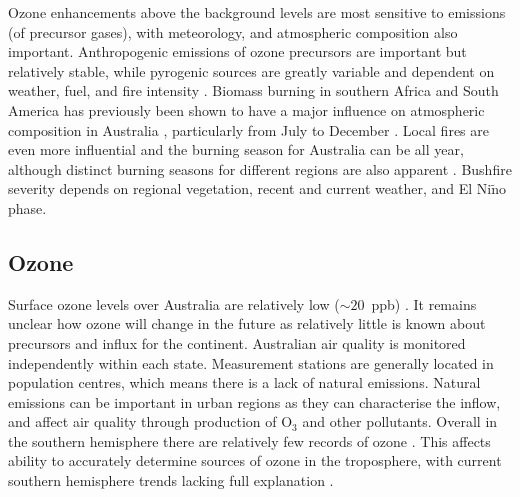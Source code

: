   Ozone enhancements above the background levels are most sensitive to emissions (of precursor gases), with meteorology, and atmospheric composition also important.
  Anthropogenic emissions of ozone precursors are important but relatively stable, while pyrogenic sources are greatly variable and dependent on weather, fuel, and fire intensity \parencite[e.g.,][]{Lawson2017}. 
  Biomass burning in southern Africa and South America has previously been shown to have a major influence on atmospheric composition in Australia \parencite{Oltmans2001, Gloudemans2006, Edwards2006}, particularly from July to December \parencite{Pak2003, Liu2016}.
  Local fires are even more influential and the burning season for Australia can be all year, although distinct burning seasons for different regions are also apparent \parencite{Smith2007}.
  Bushfire severity depends on regional vegetation, recent and current weather, and El Ni$\tilde{\textrm{n}}$o phase.
  
  
  \subsection{Ozone}
    Surface ozone levels over Australia are relatively low ($\sim20$~ppb) \parencite{Young2018}.
    It remains unclear how ozone will change in the future as relatively little is known about precursors and influx for the continent.
    Australian air quality is monitored independently within each state. %
    Measurement stations are generally located in population centres, which means there is a lack of natural emissions. %
    Natural emissions can be important in urban regions as they can characterise the inflow, and affect air quality through production of O$_3$ and other pollutants.
    Overall in the southern hemisphere there are relatively few records of ozone \parencite{Huang2018}.
    This affects ability to accurately determine sources of ozone in the troposphere, with current southern hemisphere trends lacking full explanation \parencite{Zeng2017}. 
    
